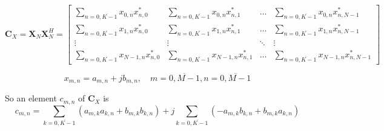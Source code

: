 \begin{equation}
    \bm{C}_X
    = \bm{X}_N \bm{X}_N^H = 
    \begin{bmatrix}
        \displaystyle{\sum_{n=\overline{0, K-1}} x_{0,n}x_{n,0}^*} & 
        \displaystyle{\sum_{n=\overline{0, K-1}} x_{0,n}x_{n,1}^*} & 
        \hdots &
        \displaystyle{\sum_{n=\overline{0, K-1}} x_{0,n}x_{n,N-1}^*} \\
        \displaystyle{\sum_{n=\overline{0, K-1}} x_{1,n}x_{n,0}^*} & 
        \displaystyle{\sum_{n=\overline{0, K-1}} x_{1,n}x_{n,1}^*} & 
        \hdots &
        \displaystyle{\sum_{n=\overline{0, K-1}} x_{1,n}x_{n,N-1}^*} \\
        \vdots & \vdots & \ddots & \vdots \\
        \displaystyle{\sum_{n=\overline{0, K-1}} x_{N-1,n}x_{n,0}^*} & 
        \displaystyle{\sum_{n=\overline{0, K-1}} x_{N-1,n}x_{n,1}^*} & 
        \hdots &
        \displaystyle{\sum_{n=\overline{0, K-1}} x_{N-1,n}x_{n,N-1}^*}
    \end{bmatrix}
\end{equation}

\begin{equation}
x_{m,n} = a_{m,n} + jb_{m,n}, \quad m = \overline{0, M-1}, n = \overline{0, M-1}
\end{equation}

So an element $c_{m, n}$ of $\bm{C}_X$ is
\begin{equation}
c_{m, n} = \sum_{k=\overline{0, K-1}} (a_{m,k}a_{k,n} + b_{m,k}b_{k,n}) + 
          j\sum_{k=\overline{0, K-1}} (-a_{m,k}b_{k,n} + b_{m,k}a_{k,n})
\end{equation}


